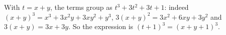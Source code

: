 With $t=x+y$, the terms group as $t^3+3t^2+3t+1$: indeed $(x+y)^3=x^3+3x^2y+3xy^2+y^3$, $3(x+y)^2=3x^2+6xy+3y^2$ and $3(x+y)=3x+3y$. So the expression is $(t+1)^3=\boxed{(x+y+1)^3}$.
